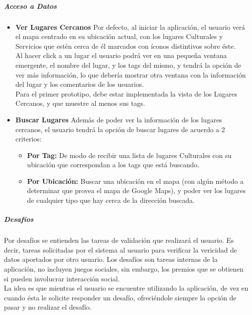 \documentclass[10pt,letterpaper]{article}
\begin{document}
\subparagraph{Acceso a Datos}
\begin{itemize}
 \item \textbf{Ver Lugares Cercanos} Por defecto, al iniciar la aplicación, el usuario verá el mapa centrado en su ubicación actual, con los lugares Culturales y Servicios que estén cerca de él marcados con íconos distintivos sobre éste.\\

Al hacer click a un lugar el usuario podrá ver en una pequeña ventana emergente, el nombre del lugar, y los tags del mismo, y tendrá la opción de ver más información, lo que debería mostrar otra ventana con la información del lugar y los comentarios de los usuarios.\\

Para el primer prototipo, debe estar implementada la vista de los Lugares Cercanos, y que muestre al menos sus tags.\\

 \item \textbf{Buscar Lugares} Además de poder ver la información de los lugares cercanos, el usuario tendrá la opción de buscar lugares de acuerdo a 2 criterios:\\

\begin{itemize}
\item \textbf{Por Tag:} De modo de recibir una lista de lugares Culturales con su ubicación que correspondan a los tags que está buscando.
\item \textbf{Por Ubicación:} Buscar una ubicación en el mapa (con algún método a determinar que provea el mapa de Google Maps), y poder ver los lugares de cualquier tipo que hay cerca de la dirección buscada.
\end{itemize}
\end{itemize}

\subparagraph{Desafíos}

Por desafíos se entienden las tareas de validación que realizará el usuario. Es decir, tareas solicitadas por el sistema al usuario para verificar la vericidad de datos aportados por otro usuario. Los desafíos son tareas internas de la aplicación, no incluyen juegos sociales, sin embargo, los premios que se obtienen si pueden involucrar interacción social.\\

La idea es que mientras el usuario se encuentre utilizando la aplicación, de vez en cuando ésta le solicite responder un desafío, ofreciéndole siempre la opción de pasar y no realizar el desafío.\\
\end{document}
